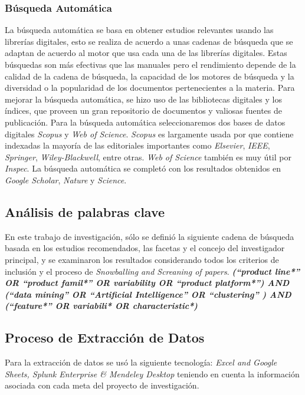 \subsubsection{Búsqueda Automática}
La búsqueda automática se basa en obtener estudios relevantes usando las librerías digitales, esto se realiza de acuerdo a unas cadenas de búsqueda que se adaptan de acuerdo al motor que usa cada una de las librerías digitales. Estas búsquedas son más efectivas que las manuales pero el rendimiento depende de la calidad de la cadena de búsqueda, la capacidad de los motores de búsqueda y la diversidad o la popularidad de los documentos pertenecientes a la materia. Para mejorar la búsqueda automática, se hizo uso de las bibliotecas digitales y los índices, que proveen un gran repositorio de documentos y valiosas fuentes de publicación. Para la búsqueda automática seleccionaremos dos bases de datos digitales \textit{Scopus} y \textit{Web of Science}. \textit{Scopus} es largamente usada por que contiene indexadas la mayoría de las editoriales importantes como \textit{Elsevier}, \textit{IEEE}, \textit{Springer}, \textit{Wiley-Blackwell}, entre otras. \textit{Web of Science} también es muy útil por \textit{Inspec}. La búsqueda automática se completó con los resultados obtenidos en \textit{Google Scholar}, \textit{Nature} y \textit{Science}.


\subsection{Análisis de palabras clave}
En este trabajo de investigación, sólo se definió la siguiente cadena de búsqueda basada en los estudios recomendados, las facetas  y el concejo del investigador principal, y se examinaron los resultados considerando todos los criterios de inclusión y el proceso de \textit{Snowballing and Screaning of papers}.
\textbf{\textit{
(“product line*” OR “product famil*” OR variability OR “product platform*”) AND (“data mining” OR “Artificial Intelligence” OR “clustering” ) AND (“feature*” OR variabili*  OR characteristic*)
}}

\subsection{Proceso de Extracción de Datos}
Para la extracción de datos se usó la siguiente tecnología: \textit{Excel and Google Sheets, Splunk Enterprise \& Mendeley Desktop} teniendo en cuenta la información asociada con cada meta del proyecto de investigación.


